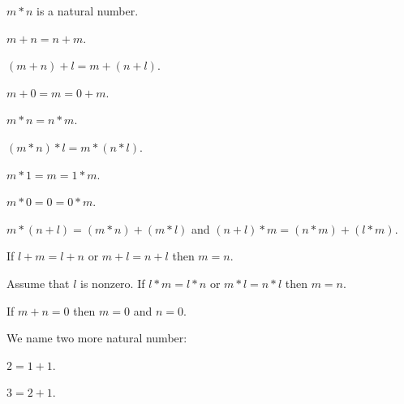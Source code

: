 \documentclass[english,11pt]{article}
\begin{document}
\begin{forthel}

\begin{signature}
$m * n$ is a natural number.
\end{signature}

\begin{axiom}
$m + n = n + m$.
\end{axiom}

\begin{axiom}
$(m + n) + l = m + (n + l)$.
\end{axiom}

\begin{axiom}
$m + 0 = m = 0 + m$.
\end{axiom}

\begin{axiom}
$m * n = n * m$.
\end{axiom}

\begin{axiom}
$(m * n) * l = m * (n * l)$.
\end{axiom}

\begin{axiom}
$m * 1 = m = 1 * m$.
\end{axiom}

\begin{axiom}
$m * 0 = 0 = 0 * m$.
\end{axiom}

\begin{axiom}
$m * (n + l) = (m * n) + (m * l)$ and
$(n + l) * m = (n * m) + (l * m)$.
\end{axiom}

\begin{axiom}
If $l + m = l + n$ or $m + l = n + l$ then $m = n$.
\end{axiom}

\begin{axiom}
Assume that $l$ is nonzero.
If $l * m = l * n$ or $m * l = n * l$ then $m = n$.
\end{axiom}

\begin{axiom}
If $m + n = 0$ then $m = 0$ and $n = 0$.
\end{axiom}

\end{forthel}

We name two more natural number:

\begin{forthel}

\begin{definition}
$2 = 1 + 1$.
\end{definition}

\begin{definition}
$3 = 2 + 1$.
\end{definition}

\end{forthel}
\end{document}
